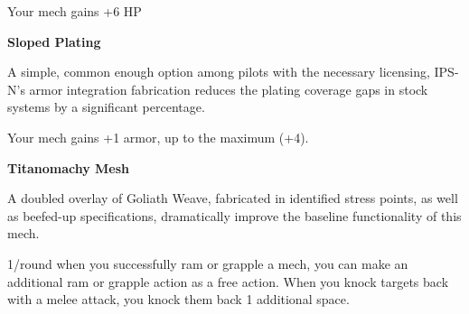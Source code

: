 Your mech gains +6 HP


\textbf{Sloped Plating}

A simple, common enough option among pilots with the necessary licensing, IPS-N's armor integration fabrication reduces the plating coverage gaps in stock systems by a significant percentage.

Your mech gains +1 armor, up to the maximum (+4).


\textbf{Titanomachy Mesh}

A doubled overlay of Goliath Weave, fabricated in identified stress points, as well as beefed-up specifications, dramatically improve the baseline functionality of this mech.

1/round when you successfully ram or grapple a mech, you can make an additional ram or grapple action as a free action. When you knock targets back with a melee attack, you knock them back 1 additional space.